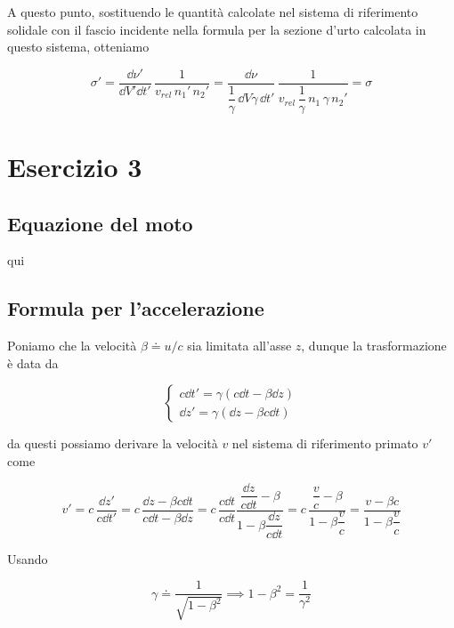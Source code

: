 \documentclass[12pt]{report}
\begin{document}
A questo punto, sostituendo le quantità calcolate nel sistema di riferimento solidale con il fascio incidente nella formula per la sezione d'urto calcolata in questo sistema, otteniamo

\begin{equation}
	\sigma' = \dfrac{\dd{\nu}'}{\dd{V}' \dd{t}'} \, \dfrac{1}{v_{rel} \, n_{1}' \, n_{2}'} %
	= \dfrac{\dd{\nu}}{\dfrac{1}{\gamma} \, \dd{V} \gamma \, \dd{t}'} \, \dfrac{1}{v_{rel} \, \dfrac{1}{\gamma} \, n_{1} \, \gamma \, n_{2}'} %
	= \sigma
\end{equation}

\section{Esercizio 3}

\subsection*{Equazione del moto}

qui

\subsection*{Formula per l'accelerazione}

Poniamo che la velocità $\beta \doteq u / c$ sia limitata all'asse $z$, dunque la trasformazione è data da

\begin{equation}
	\begin{cases}
		c \dd{t}' = \gamma (c \dd{t} - \beta \dd{z}) \\
		\dd{z}' = \gamma (\dd{z} - \beta c \dd{t})
	\end{cases}
\end{equation}

da questi possiamo derivare la velocità $v$ nel sistema di riferimento primato $v'$ come

\begin{equation}
	v' = c \, \dfrac{\dd{z}'}{c \dd{t}'} %
	= c \, \dfrac{\dd{z} - \beta c \dd{t}}{c \dd{t} - \beta \dd{z}} %
	= c \, \dfrac{c \dd{t}}{c \dd{t}} \dfrac{\dfrac{\dd{z}}{c \dd{t}} - \beta}{1 - \beta \dfrac{\dd{z}}{c \dd{t}}} %
	= c \, \dfrac{\dfrac{v}{c} - \beta}{1 - \beta \dfrac{v}{c}} %
	= \dfrac{v - \beta c}{1 - \beta \dfrac{v}{c}}
\end{equation}

Usando

\begin{equation}
	\gamma \doteq \dfrac{1}{\sqrt{1 - \beta^{2}}} %
	\implies %
	1 - \beta^{2} = \dfrac{1}{\gamma^{2}}
\end{equation}
\end{document}
